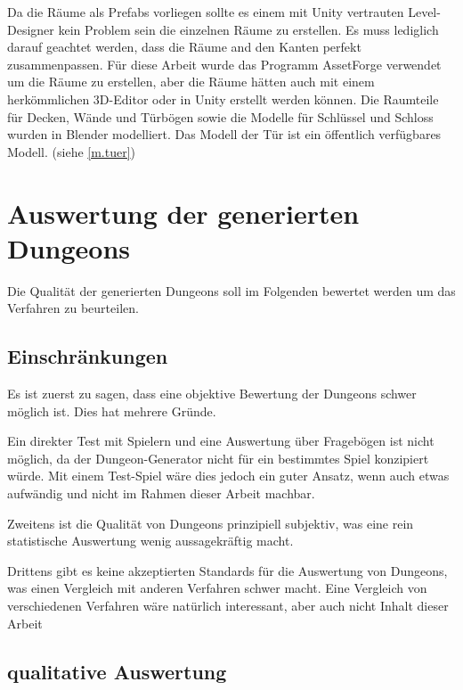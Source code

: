Da die Räume als Prefabs vorliegen sollte es einem mit Unity vertrauten Level-Designer kein Problem sein die einzelnen Räume zu erstellen. Es muss lediglich darauf geachtet werden, dass die Räume and den Kanten perfekt zusammenpassen. Für diese Arbeit wurde das Programm AssetForge verwendet um die Räume zu erstellen, aber die Räume hätten auch mit einem herkömmlichen 3D-Editor oder in Unity erstellt werden können. Die Raumteile für Decken, Wände und Türbögen sowie die Modelle für Schlüssel und Schloss wurden in Blender modelliert. Das Modell der Tür ist ein öffentlich verfügbares Modell. (siehe \ref{m.tuer})


\chapter{Auswertung der generierten Dungeons}

Die Qualität der generierten Dungeons soll im Folgenden bewertet werden um das Verfahren zu beurteilen. 

\section{Einschränkungen}

Es ist zuerst zu sagen, dass eine objektive Bewertung der Dungeons schwer möglich ist. Dies hat mehrere Gründe.

Ein direkter Test mit Spielern und eine Auswertung über Fragebögen ist nicht möglich, da der Dungeon-Generator nicht für ein bestimmtes Spiel konzipiert würde. Mit einem Test-Spiel wäre dies jedoch ein guter Ansatz, wenn auch etwas aufwändig und nicht im Rahmen dieser Arbeit machbar.

Zweitens ist die Qualität von Dungeons prinzipiell subjektiv, was eine rein statistische Auswertung wenig aussagekräftig macht.

Drittens gibt es keine akzeptierten Standards für die Auswertung von Dungeons, was einen Vergleich mit anderen Verfahren schwer macht. Eine Vergleich von verschiedenen Verfahren wäre natürlich interessant, aber auch nicht Inhalt dieser Arbeit 

\section{qualitative Auswertung}

